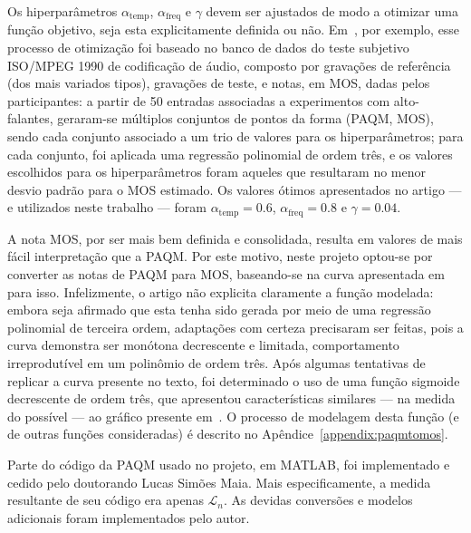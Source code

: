 Os hiperparâmetros $\alpha_{\text{temp}}$, $\alpha_{\text{freq}}$ e $\gamma$ devem ser
ajustados de modo a otimizar uma função objetivo, seja esta explicitamente definida ou
não. Em~\cite{beerends-2002}, por exemplo, esse processo de otimização foi baseado no
banco de dados do teste subjetivo ISO/MPEG 1990 de codificação de áudio, composto por
gravações de referência (dos mais variados tipos), gravações de teste, e notas, em MOS,
dadas pelos participantes: a partir de 50 entradas associadas a experimentos com
alto-falantes, geraram-se múltiplos conjuntos de pontos da forma (PAQM, MOS), sendo
cada conjunto associado a um trio de valores para os hiperparâmetros; para cada
conjunto, foi aplicada uma regressão polinomial de ordem três, e os valores escolhidos
para os hiperparâmetros foram aqueles que resultaram no menor desvio padrão para o MOS
estimado. Os valores ótimos apresentados no artigo --- e utilizados neste trabalho ---
foram $\alpha_{\text{temp}} = 0.6$, $\alpha_{\text{freq}} = 0.8$ e $\gamma = 0.04$.

A nota MOS, por ser mais bem definida e consolidada, resulta em valores de mais fácil
interpretação que a PAQM. Por este motivo, neste projeto optou-se por converter as
notas de PAQM para MOS, baseando-se na curva apresentada em~\cite{beerends-2002} para
isso. Infelizmente, o artigo não explicita claramente a função modelada: embora seja
afirmado que esta tenha sido gerada por meio de uma regressão polinomial de terceira
ordem, adaptações com certeza precisaram ser feitas, pois a curva demonstra ser
monótona decrescente e limitada, comportamento irreprodutível em um polinômio de ordem
três. Após algumas tentativas de replicar a curva presente no texto, foi determinado o
uso de uma função sigmoide decrescente de ordem três, que apresentou características
similares --- na medida do possível --- ao gráfico presente em~\cite{beerends-2002}. O
processo de modelagem desta função (e de outras funções consideradas) é descrito no
Apêndice~\ref{appendix:paqmtomos}.

Parte do código da PAQM usado no projeto, em MATLAB, foi implementado e cedido pelo
doutorando Lucas Simões Maia. Mais especificamente, a medida resultante de seu código
era apenas $\mathcal{L}_n$. As devidas conversões e modelos adicionais foram
implementados pelo autor.

\section{\texorpdfstring{\rnonlin{}}{Rnonlin}}
\label{section:metrics:rnonlin}

